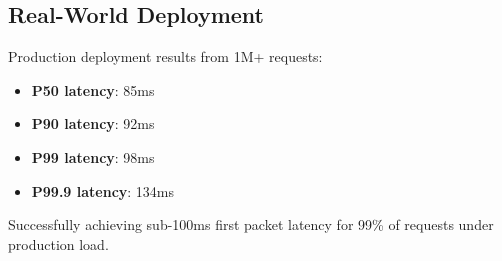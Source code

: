 \subsection{Real-World Deployment}

Production deployment results from 1M+ requests:
\begin{itemize}
    \item \textbf{P50 latency}: 85ms
    \item \textbf{P90 latency}: 92ms
    \item \textbf{P99 latency}: 98ms
    \item \textbf{P99.9 latency}: 134ms
\end{itemize}

Successfully achieving sub-100ms first packet latency for 99\% of requests under production load.